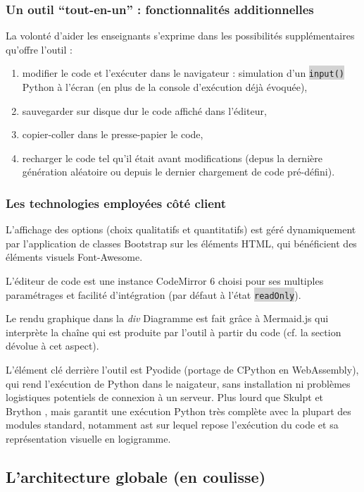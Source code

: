 \documentclass[11pt,a4paper]{article}
\let\cite\parencite
\newcommand{\code}[1]{\colorbox{lightgray}{\texttt{\small #1}}}
\begin{document}
\subsubsection{Un outil ``tout-en-un'' : fonctionnalités additionnelles}
La volonté d'aider les enseignants s'exprime dans les possibilités supplémentaires qu'offre l'outil : \begin{enumerate} 
    \item modifier le code et l'exécuter dans le navigateur : simulation d'un \code{input()} Python à l'écran (en plus de la console d'exécution déjà évoquée),
    \item sauvegarder sur disque dur le code affiché dans l'éditeur, 
    \item copier-coller dans le presse-papier le code,
    \item recharger le code tel qu'il était avant modifications (depus la dernière génération aléatoire ou depuis le dernier chargement de code pré-défini).
\end{enumerate}
\subsubsection{Les technologies employées côté client}
L'affichage des options (choix qualitatifs et quantitatifs) est géré dynamiquement par l'application de classes Bootstrap sur les éléments HTML, qui bénéficient des éléments visuels Font-Awesome.\par
L'éditeur de code est une instance CodeMirror 6 \cite{codemirror6} choisi pour ses multiples paramétrages et facilité d'intégration (par défaut à l'état \code{readOnly}). \par Le rendu graphique dans la \textit{div} Diagramme est fait grâce à  Mermaid.js qui interprète la chaîne qui est produite par l'outil à partir du code (cf. la section dévolue à cet aspect). \par L'élément clé derrière l'outil est Pyodide (portage de CPython en WebAssembly), qui rend l'exécution de Python dans le naigateur, sans installation ni problèmes logistiques potentiels de connexion à un serveur. Plus lourd que Skulpt \cite{skulpt} et Brython \cite{brython}, mais garantit une exécution Python très complète avec la plupart des modules standard, notamment ast sur lequel repose l'exécution du code et sa représentation visuelle en logigramme.

\subsection{L'architecture globale (en coulisse)}
\end{document}
